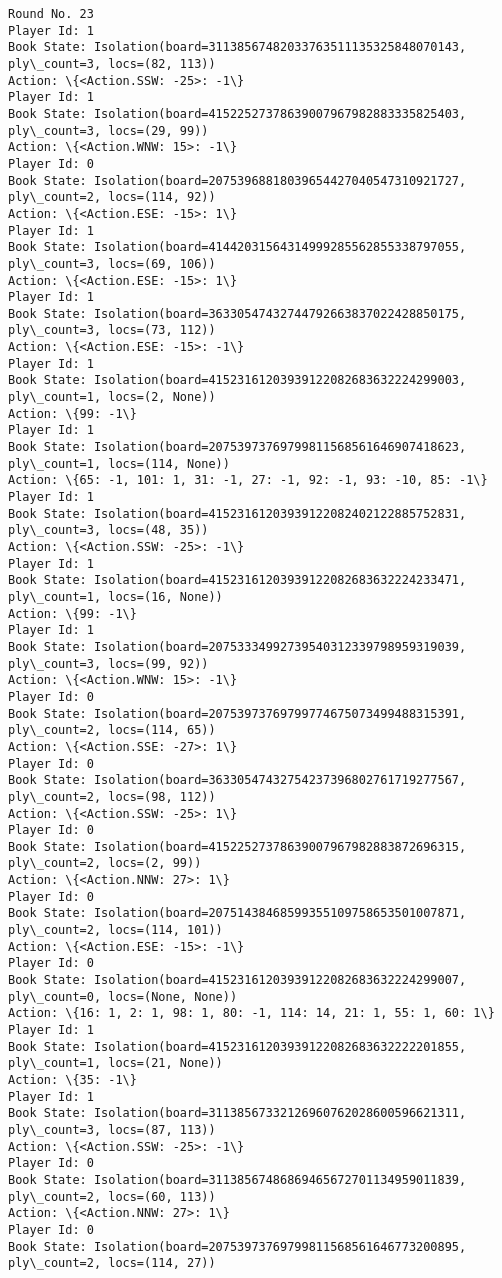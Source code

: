 \documentclass[11pt]{article}
\begin{document}
\begin{Verbatim}[commandchars=\\\{\}]
Round No. 23
Player Id: 1
Book State: Isolation(board=31138567482033763511135325848070143, ply\_count=3, locs=(82, 113))
Action: \{<Action.SSW: -25>: -1\}
Player Id: 1
Book State: Isolation(board=41522527378639007967982883335825403, ply\_count=3, locs=(29, 99))
Action: \{<Action.WNW: 15>: -1\}
Player Id: 0
Book State: Isolation(board=20753968818039654427040547310921727, ply\_count=2, locs=(114, 92))
Action: \{<Action.ESE: -15>: 1\}
Player Id: 1
Book State: Isolation(board=41442031564314999285562855338797055, ply\_count=3, locs=(69, 106))
Action: \{<Action.ESE: -15>: 1\}
Player Id: 1
Book State: Isolation(board=36330547432744792663837022428850175, ply\_count=3, locs=(73, 112))
Action: \{<Action.ESE: -15>: -1\}
Player Id: 1
Book State: Isolation(board=41523161203939122082683632224299003, ply\_count=1, locs=(2, None))
Action: \{99: -1\}
Player Id: 1
Book State: Isolation(board=20753973769799811568561646907418623, ply\_count=1, locs=(114, None))
Action: \{65: -1, 101: 1, 31: -1, 27: -1, 92: -1, 93: -10, 85: -1\}
Player Id: 1
Book State: Isolation(board=41523161203939122082402122885752831, ply\_count=3, locs=(48, 35))
Action: \{<Action.SSW: -25>: -1\}
Player Id: 1
Book State: Isolation(board=41523161203939122082683632224233471, ply\_count=1, locs=(16, None))
Action: \{99: -1\}
Player Id: 1
Book State: Isolation(board=20753334992739540312339798959319039, ply\_count=3, locs=(99, 92))
Action: \{<Action.WNW: 15>: -1\}
Player Id: 0
Book State: Isolation(board=20753973769799774675073499488315391, ply\_count=2, locs=(114, 65))
Action: \{<Action.SSE: -27>: 1\}
Player Id: 0
Book State: Isolation(board=36330547432754237396802761719277567, ply\_count=2, locs=(98, 112))
Action: \{<Action.SSW: -25>: 1\}
Player Id: 0
Book State: Isolation(board=41522527378639007967982883872696315, ply\_count=2, locs=(2, 99))
Action: \{<Action.NNW: 27>: 1\}
Player Id: 0
Book State: Isolation(board=20751438468599355109758653501007871, ply\_count=2, locs=(114, 101))
Action: \{<Action.ESE: -15>: -1\}
Player Id: 0
Book State: Isolation(board=41523161203939122082683632224299007, ply\_count=0, locs=(None, None))
Action: \{16: 1, 2: 1, 98: 1, 80: -1, 114: 14, 21: 1, 55: 1, 60: 1\}
Player Id: 1
Book State: Isolation(board=41523161203939122082683632222201855, ply\_count=1, locs=(21, None))
Action: \{35: -1\}
Player Id: 1
Book State: Isolation(board=31138567332126960762028600596621311, ply\_count=3, locs=(87, 113))
Action: \{<Action.SSW: -25>: -1\}
Player Id: 0
Book State: Isolation(board=31138567486869465672701134959011839, ply\_count=2, locs=(60, 113))
Action: \{<Action.NNW: 27>: 1\}
Player Id: 0
Book State: Isolation(board=20753973769799811568561646773200895, ply\_count=2, locs=(114, 27))

\end{Verbatim}
\end{document}
